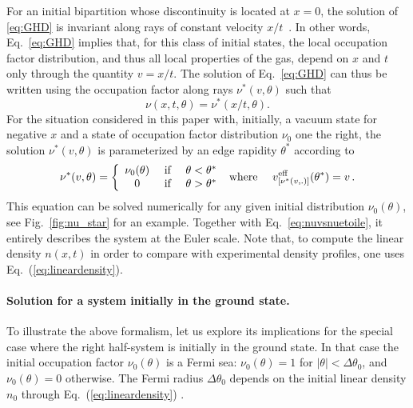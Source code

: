 For an initial bipartition whose discontinuity is located at $x=0$, the solution of \eqref{eq:GHD} is invariant along rays of constant velocity $x/t$~\cite{bertini_transport_2016,castro-alvaredo_emergent_2016}. In other words, Eq.~\eqref{eq:GHD} implies that, for this class of initial states, 
the local occupation factor distribution, and thus all local properties of the gas,  depend on $x$ and $t$ only through the quantity $v=x/t$. The solution of Eq.~\eqref{eq:GHD} can thus be written 
using the occupation factor along rays $\nu^*(v,\theta)$ such that
\begin{equation}
\label{eq:nuvsnuetoile}
    \nu(x,t,\theta)=\nu^*( x/t,\theta).
\end{equation} 
For the situation considered in this paper with, initially, a vacuum state for negative $x$ and a state of occupation factor distribution $\nu_0$ one the right, 
 the solution $\nu^*(v,\theta)$ is parameterized by an edge rapidity $\theta^*$ according to~\cite{bertini_transport_2016,castro-alvaredo_emergent_2016}
\begin{equation}
\label{eq:nuetoile}
    \nu^*(v,\theta)=\left \{ \begin{array}{ccc} 
    \nu_0(\theta) &\mbox{ if }& \theta < \theta^*\\
    0 & \mbox{ if } & \theta > \theta^*\\
    \end{array} \right . \mbox{ where  \quad }  v^{\rm{eff}}_{[\nu^*(v,.) ]}(\theta^*)=v \, .
\end{equation}
This equation can be solved numerically 
for any given initial distribution $\nu_0(\theta)$, see Fig.~\ref{fig:nu_star} for an example. Together with Eq.~\eqref{eq:nuvsnuetoile}, it entirely describes the system at the Euler scale. Note that, to compute the linear density $n(x,t)$ in order to compare with experimental density profiles,  one uses Eq.~(\ref{eq:lineardensity}).

\paragraph{Solution for a system initially in the ground state.}
To illustrate the above formalism, let us explore its implications for the special case where the right half-system is initially in the ground 
state. In that case the initial occupation factor $\nu_0 (\theta)$ is a Fermi sea: $\nu_0(\theta)=1$ for $|\theta| < \Delta\theta_0$, and $\nu_0(\theta)=0$ otherwise. The Fermi radius $\Delta\theta_0$ depends on the initial linear density $n_0$ through Eq.~(\ref{eq:lineardensity}) \cite{lieb_exact_1963}.

